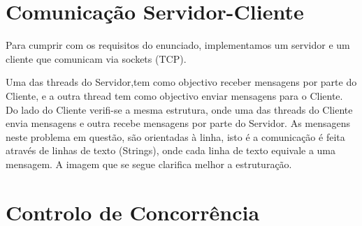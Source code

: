 \chapter{Comunicação Servidor-Cliente}
Para cumprir com os requisitos do enunciado, implementamos um servidor e
um cliente que comunicam via sockets (TCP). 

 Uma das threads do Servidor,tem como objectivo receber mensagens por parte do Cliente, e a outra thread tem como objectivo enviar mensagens para o Cliente. Do lado do Cliente verifi-se a mesma estrutura, onde uma das threads do Cliente envia mensagens e outra recebe mensagens por parte do Servidor. As mensagens neste problema em questão, são orientadas à linha, isto é a comunicação é feita através de linhas de texto (Strings), onde cada linha de texto equivale a uma mensagem. A imagem que se segue clarifica melhor a estruturação. 
 
 

\chapter{Controlo de Concorrência}

